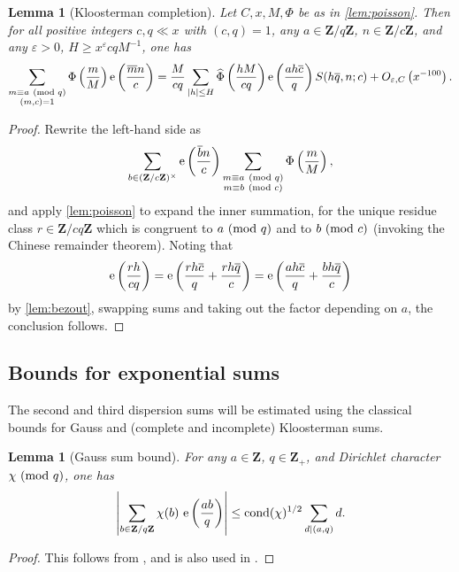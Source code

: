 \documentclass[reqno,11pt]{amsart}
\newtheorem{lemma}[theorem]{Lemma}
\theoremstyle{definition}
\theoremstyle{remark}
\numberwithin{equation}{section}
\newcommand{\Z}{\mathbf{Z}}
\newcommand{\e}{\textnormal{e}}
\newcommand{\eps}{\varepsilon}
\renewcommand{\bar}{\overline}
\renewcommand{\hat}{\widehat}
\newcommand{\cond}{\textnormal{cond}}
\renewcommand{\pmod}[1]{\ (\textnormal{mod } #1)}
\begin{document}
\begin{lemma}[Kloosterman completion] \label{lem:completion}
Let $C, x, M, \Phi$ be as in \cref{lem:poisson}. Then for all positive integers $c, q \ll x$ with $(c, q) = 1$, any $a \in \Z/q\Z$, $n \in \Z/c\Z$, and any $\eps > 0$, $H \ge x^\eps cq M^{-1}$, one has
\[
    \sum_{\substack{m \equiv a \pmod{q} \\ (m, c) = 1}} 
    \Phi\left(\frac{m}{M}\right) \e\left(\frac{\bar{m}n}{c}\right)
    =
    \frac{M}{cq} \sum_{|h| \le H} \hat{\Phi}\left(\frac{hM}{cq}\right) \e\left(\frac{ah \bar{c}}{q}\right)
    S(h\bar{q}, n; c)
    +  
    O_{\eps, C}\left(x^{-100}\right).
\] %
\end{lemma} %
\begin{proof}
Rewrite the left-hand side as
\[
    \sum_{b \in (\Z/c\Z)^\times} \e\left(\frac{\bar{b} n}{c} \right)
    \sum_{\substack{m \equiv a \pmod{q} \\ m \equiv b \pmod{c}}} \Phi\left(\frac{m}{M}\right),
\]
and apply \cref{lem:poisson} to expand the inner summation, for the unique residue class $r \in \Z/cq\Z$ which is congruent to $a \pmod{q}$ and to $b \pmod{c}$ (invoking the Chinese remainder theorem). Noting that
\[
    \e \left(\frac{rh}{cq}\right)
    =
    \e \left(\frac{rh \bar{c}}{q} + \frac{rh \bar{q}}{c}\right)
    =
    \e \left(\frac{ah \bar{c}}{q} + \frac{bh \bar{q}}{c}\right)
\]
by \cref{lem:bezout}, swapping sums and taking out the factor depending on $a$, the conclusion follows.
\end{proof}



\subsection{Bounds for exponential sums}

The second and third dispersion sums will be estimated using the classical bounds for Gauss and (complete and incomplete) Kloosterman sums.

\begin{lemma}[Gauss sum bound] \label{lem:gauss}
For any $a \in \Z$, $q \in \Z_+$, and Dirichlet character $\chi \pmod{q}$, one has
\[
    \left\vert \sum_{b \in \Z/q\Z} \chi(b)\ \e\left(\frac{ab}{q}\right) \right\vert
    \le 
    \cond(\chi)^{1/2} \sum_{d \mid (a, q)} d.
\]
\end{lemma}
\begin{proof}
This follows from \cite[Lemmas 3.1 and 3.2]{iwaniec2021analytic}, and is also used in \cite[\S 3.2]{drappeau2015theoremes}.
\end{proof}
\end{document}
